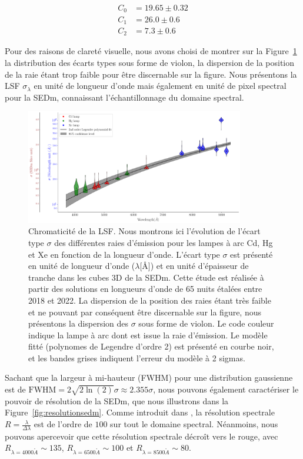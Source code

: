 \documentclass[../main/main.tex]{subfiles}
\begin{document}
\begin{align*}
  C_{0}&=19.65\pm 0.32\\
  C_{1}&=26.0\pm 0.6\\
  C_{2}&=7.3\pm 0.6
\end{align*}

Pour des raisons de clareté visuelle, nous avons choisi de montrer sur
la Figure~\ref{fig:lsf} la distribution des écarts types sous forme de
violon, la dispersion de la position de la raie étant trop faible pour
être discernable sur la figure. Nous présentons la LSF
$\sigma_{\lambda}$ en unité de longueur d'onde mais également en unité
de pixel spectral pour la SEDm,
connaissant l'échantillonnage du domaine spectral.

\begin{figure}[h!]
  \centering
  \includegraphics[width=0.85\textwidth]{../figures/06_irf/LSF.pdf}
  \caption[Chromaticité de la LSF]{Chromaticité de la LSF. Nous montrons
  ici l'évolution de l'écart type $\sigma$ des différentes raies
  d'émission pour les lampes à arc Cd, Hg et Xe en fonction de la
  longueur d'onde. L'écart type $\sigma$ est présenté en unité de
  longueur d'onde ($\lambda$[\AA]) et en unité d'épaisseur de tranche
  dans les cubes 3D de la SEDm. Cette étude est réalisée à partir des
  solutions en longueurs d'onde de 65 nuits étalées entre 2018 et
  2022. La dispersion de la position des raies étant très faible et ne
  pouvant par conséquent être discernable sur la figure, nous présentons
la dispersion des $\sigma$ sous forme de violon. Le code couleur indique
la lampe à arc dont est issue la raie d'émission. Le modèle fitté
(polynomes de Legendre d'ordre 2) est présenté en courbe noir, et les
bandes grises indiquent l'erreur du modèle à 2 sigmas. }
  \label{fig:lsf}
\end{figure}

Sachant que la largeur à mi-hauteur (FWHM) pour une distribution
gaussienne est de $\text{FWHM}=2\sqrt{2\ln(2)}\sigma\approx2.355\sigma$, nous
pouvons également caractériser le pouvoir de résolution de la SEDm, que
nous illustrons dans la Figure~\ref{fig:resolutionsedm}.
Comme introduit dans \citet{SEDM18}, la résolution spectrale
$R=\frac{\lambda}{\Delta\lambda}$ est de l'ordre de $100$ sur tout le
domaine spectral. Néanmoins, nous pouvons apercevoir que cette
résolution spectrale décroît vers le rouge, avec
$R_{\lambda=4000\mathring{A}}\sim135$,
$R_{\lambda=6500\mathring{A}}\sim100$ et $R_{\lambda=8500\mathring{A}}\sim80$.\\
\end{document}
